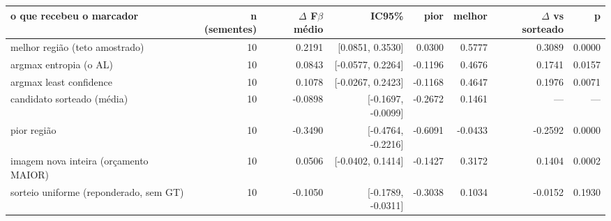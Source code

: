 \begin{adjustbox}{max width=\linewidth}
\begin{tabular}{lrrrrrrr}
\toprule
o que recebeu o marcador & n (sementes) & $\Delta$ F$\beta$ médio & IC95\% & pior & melhor & $\Delta$ vs sorteado & p \\
\midrule
melhor região (teto amostrado) & 10 & 0.2191 & [0.0851, 0.3530] & 0.0300 & 0.5777 & 0.3089 & 0.0000 \\
argmax entropia (o AL) & 10 & 0.0843 & [-0.0577, 0.2264] & -0.1196 & 0.4676 & 0.1741 & 0.0157 \\
argmax least confidence & 10 & 0.1078 & [-0.0267, 0.2423] & -0.1168 & 0.4647 & 0.1976 & 0.0071 \\
candidato sorteado (média) & 10 & -0.0898 & [-0.1697, -0.0099] & -0.2672 & 0.1461 & --- & --- \\
pior região & 10 & -0.3490 & [-0.4764, -0.2216] & -0.6091 & -0.0433 & -0.2592 & 0.0000 \\
imagem nova inteira (orçamento MAIOR) & 10 & 0.0506 & [-0.0402, 0.1414] & -0.1427 & 0.3172 & 0.1404 & 0.0002 \\
sorteio uniforme (reponderado, sem GT) & 10 & -0.1050 & [-0.1789, -0.0311] & -0.3038 & 0.1034 & -0.0152 & 0.1930 \\
\bottomrule
\end{tabular}
\end{adjustbox}
